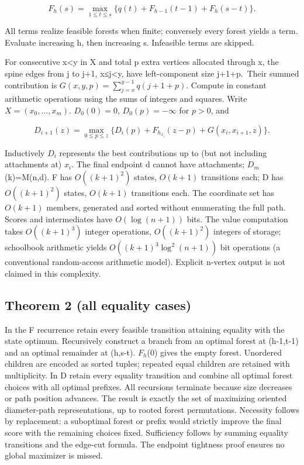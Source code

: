 \documentclass[
  10pt,
  a4paper,
]{article}
\begin{document}
\[F_h(s)=\max_{1\le t\le s}\{q(t)+F_{h-1}(t-1)+F_h(s-t)\}.\]

All terms realize feasible forests when finite; conversely every forest
yields a term. Evaluate increasing h, then increasing s. Infeasible
terms are skipped.

For consecutive x\textless y in X and total p extra vertices allocated
through x, the spine edges from j to j+1, x≤j\textless y, have
left-component size j+1+p.~Their summed contribution is
\(G(x,y,p)=\sum_{j=x}^{y-1}q(j+1+p)\). Compute in constant arithmetic
operations using the sums of integers and squares. Write
\(X=(x_0,\ldots,x_m)\). \(D_0(0)=0\), \(D_0(p)=-\infty\) for \(p>0\),
and

\[D_{i+1}(z)=\max_{0\le p\le z}\{D_i(p)+F_{h_{x_i}}(z-p)+G(x_i,x_{i+1},z)\}.\]

Inductively \(D_i\) represents the best contributions up to (but not
including attachments at) \(x_i\). The final endpoint d cannot have
attachments; \(D_m\)(k)=M(n,d). F has \(O((k+1)^2)\) states, \(O(k+1)\)
transitions each; D has \(O((k+1)^2)\) states, \(O(k+1)\) transitions
each. The coordinate set has \(O(k+1)\) members, generated and sorted
without enumerating the full path. Scores and intermediates have
\(O(\log(n+1))\) bits. The value computation takes \(O((k+1)^3)\)
integer operations, \(O((k+1)^2)\) integers of storage; schoolbook
arithmetic yields \(O((k+1)^3\log^2(n+1))\) bit operations (a
conventional random-access arithmetic model). Explicit n-vertex output
is not claimed in this complexity.

\subsection{Theorem 2 (all equality
cases)}\label{theorem-2-all-equality-cases}

In the F recurrence retain every feasible transition attaining equality
with the state optimum. Recursively construct a branch from an optimal
forest at (h-1,t-1) and an optimal remainder at (h,s-t). \(F_h\)(0)
gives the empty forest. Unordered children are encoded as sorted tuples;
repeated equal children are retained with multiplicity. In D retain
every equality transition and combine all optimal forest choices with
all optimal prefixes. All recursions terminate because size decreases or
path position advances. The result is exactly the set of maximizing
oriented diameter-path representations, up to rooted forest
permutations. Necessity follows by replacement: a suboptimal forest or
prefix would strictly improve the final score with the remaining choices
fixed. Sufficiency follows by summing equality transitions and the
edge-cut formula. The endpoint tightness proof ensures no global
maximizer is missed.
\end{document}
